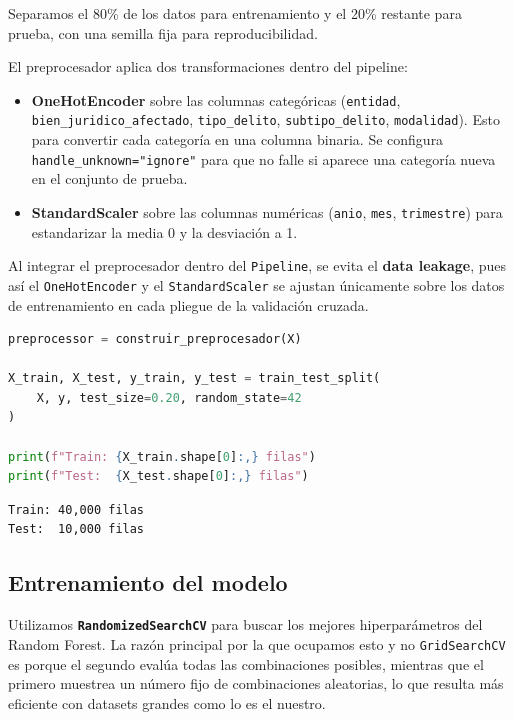 Separamos el 80\% de los datos para entrenamiento y el 20\% restante para prueba, con una semilla fija para
reproducibilidad.

El preprocesador aplica dos transformaciones dentro del pipeline:

\begin{itemize}
  \item \textbf{OneHotEncoder} sobre las columnas categóricas (\texttt{entidad}, \texttt{bien\_juridico\_afectado}, \texttt{tipo\_delito},
  \texttt{subtipo\_delito}, \texttt{modalidad}). Esto para convertir cada categoría en una columna binaria. Se configura
  \texttt{handle\_unknown="ignore"} para que no falle si aparece una categoría nueva en el conjunto de prueba.
  \item \textbf{StandardScaler} sobre las columnas numéricas (\texttt{anio}, \texttt{mes}, \texttt{trimestre}) para estandarizar la
  media 0 y la desviación a 1.
\end{itemize}

Al integrar el preprocesador dentro del \texttt{Pipeline}, se evita el \textbf{data leakage}, pues así el
\texttt{OneHotEncoder} y el \texttt{StandardScaler} se ajustan únicamente sobre los datos de entrenamiento en cada
pliegue de la validación cruzada.

\begin{lstlisting}[language=Python, caption={Construcción del preprocesador y división train/test}, label={lst:preprocesador-split}]
preprocessor = construir_preprocesador(X)

X_train, X_test, y_train, y_test = train_test_split(
    X, y, test_size=0.20, random_state=42
)

print(f"Train: {X_train.shape[0]:,} filas")
print(f"Test:  {X_test.shape[0]:,} filas")
\end{lstlisting}

\begin{lstlisting}
Train: 40,000 filas
Test:  10,000 filas
\end{lstlisting}

\subsection{Entrenamiento del modelo}

Utilizamos \textbf{\texttt{RandomizedSearchCV}} para buscar los mejores hiperparámetros del Random Forest.
La razón principal por la que ocupamos esto y no \texttt{GridSearchCV} es porque el segundo evalúa todas
las combinaciones posibles, mientras que el primero muestrea un número fijo de combinaciones aleatorias,
lo que resulta más eficiente con datasets grandes como lo es el nuestro.

